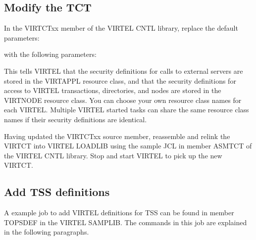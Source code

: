 \documentclass[letterpaper,10pt,english]{sphinxmanual}
\begin{document}
\subsection{Modify the TCT}
\label{\detokenize{Installation_Guide:modify-the-tct}}
\sphinxAtStartPar
In the VIRTCTxx member of the VIRTEL CNTL library, replace the default parameters:

\begin{sphinxVerbatim}[commandchars=\\\{\}]
\end{sphinxVerbatim}

\sphinxAtStartPar
with the following parameters:

\begin{sphinxVerbatim}[commandchars=\\\{\}]
\end{sphinxVerbatim}

\sphinxAtStartPar
This tells VIRTEL that the security definitions for calls to external servers are stored in the VIRTAPPL resource class, and that the security definitions for access to VIRTEL transactions, directories, and nodes are stored in the VIRTNODE resource class. You can choose your own resource class names for each VIRTEL.  Multiple VIRTEL started tasks can share the same resource class names if their security definitions are identical.

\sphinxAtStartPar
Having updated the VIRTCTxx source member, reassemble and relink the VIRTCT into VIRTEL LOADLIB using the sample JCL in member ASMTCT of the VIRTEL CNTL library. Stop and start VIRTEL to pick up the new VIRTCT.

\ignorespaces 

\subsection{Add TSS definitions}
\label{\detokenize{Installation_Guide:add-tss-definitions}}\label{\detokenize{Installation_Guide:index-187}}
\sphinxAtStartPar
A example job to add VIRTEL definitions for TSS can be found in member TOPSDEF in the VIRTEL SAMPLIB. The commands in this job are explained in the following paragraphs.
\end{document}
